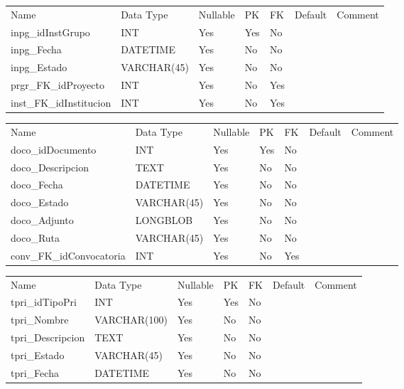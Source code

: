 			\begin{center}
				\begin{tabular}{ |l|l|l|l|l|l|l| }
					\hline
					Name & Data Type & Nullable & PK & FK & Default & Comment \\
					inpg_idInstGrupo & INT & Yes & Yes & No &  & \\ \hline 
inpg_Fecha & DATETIME & Yes & No & No &  & \\ \hline 
inpg_Estado & VARCHAR(45) & Yes & No & No &  & \\ \hline 
prgr_FK_idProyecto & INT & Yes & No & Yes &  & \\ \hline 
inst_FK_idInstitucion & INT & Yes & No & Yes &  & \\ \hline 

				\end{tabular}
			\end{center}
		

			\begin{center}
				\begin{tabular}{ |l|l|l|l|l|l|l| }
					\hline
					Name & Data Type & Nullable & PK & FK & Default & Comment \\
					doco_idDocumento & INT & Yes & Yes & No &  & \\ \hline 
doco_Descripcion & TEXT & Yes & No & No &  & \\ \hline 
doco_Fecha & DATETIME & Yes & No & No &  & \\ \hline 
doco_Estado & VARCHAR(45) & Yes & No & No &  & \\ \hline 
doco_Adjunto & LONGBLOB & Yes & No & No &  & \\ \hline 
doco_Ruta & VARCHAR(45) & Yes & No & No &  & \\ \hline 
conv_FK_idConvocatoria & INT & Yes & No & Yes &  & \\ \hline 

				\end{tabular}
			\end{center}
		

			\begin{center}
				\begin{tabular}{ |l|l|l|l|l|l|l| }
					\hline
					Name & Data Type & Nullable & PK & FK & Default & Comment \\
					tpri_idTipoPri & INT & Yes & Yes & No &  & \\ \hline 
tpri_Nombre & VARCHAR(100) & Yes & No & No &  & \\ \hline 
tpri_Descripcion & TEXT & Yes & No & No &  & \\ \hline 
tpri_Estado & VARCHAR(45) & Yes & No & No &  & \\ \hline 
tpri_Fecha & DATETIME & Yes & No & No &  & \\ \hline 

				\end{tabular}
			\end{center}
		


